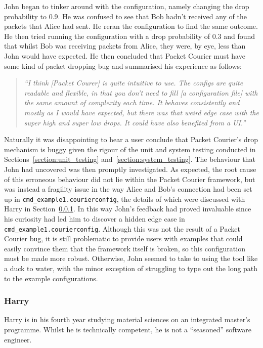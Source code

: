 John began to tinker around with the configuration, namely changing the drop probability to 0.9. He was confused to
see that Bob hadn't received any of the packets that Alice had sent. He reran the configuration to find the same
outcome. He then tried running the configuration with a drop probability of 0.3 and found that whilst Bob was
receiving packets from Alice, they were, by eye, less than John would have expected. He then concluded that Packet
Courier must have some kind of packet dropping bug and summarised his experience as follows:
\begin{quote}
    \emph{``I think [Packet Courer] is quite intuitive to use. The configs are quite readable and flexible, in that
    you don't need to fill [a configuration file] with the same amount of complexity each time. It behaves
    consistently and mostly as I would have expected, but there was that weird edge case with the super high and
    super low drops. It could have also benefited from a UI.''}
\end{quote}

Naturally it was disappointing to hear a user conclude that Packet Courier's drop mechanism is buggy given the rigour
of the unit and system testing conducted in Sections~\ref{section:unit_testing} and~\ref{section:system_testing}. The
behaviour that John had uncovered was then promptly investigated. As expected, the root cause of this erroneous
behaviour did not lie within the Packet Courier framework, but was instead a fragility issue in the way Alice and
Bob's connection had been set up in \texttt{cmd\_example1.courierconfig}, the details of which were discussed with
Harry in Section~\ref{subsubsection:harry}. In this way John's feedback had proved invaluable since his curiosity had
led him to discover a hidden edge case in \texttt{cmd\_example1.courierconfig}. Although this was not the result of a
Packet Courier bug, it is still problematic to provide users with examples that could easily convince them that the
framework itself is broken, so this configuration must be made more robust. Otherwise, John seemed to take to using
the tool like a duck to water, with the minor exception of struggling to type out the long path to the example
configurations.

\subsubsection{Harry}\label{subsubsection:harry}

Harry is in his fourth year studying material sciences on an integrated master's programme. Whilst he is technically
competent, he is not a ``seasoned'' software engineer.

